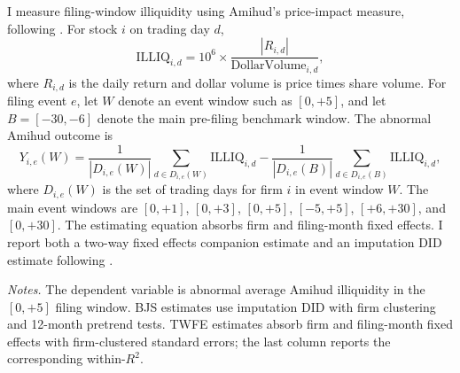 \documentclass[11pt]{article}
\newcommand{\TableNote}[1]{%
    \par\vspace{0.35em}
    \begin{minipage}{0.96\textwidth}
    \footnotesize\emph{Notes.} #1
    \end{minipage}
}
\begin{document}
I measure filing-window illiquidity using Amihud's price-impact measure,
following \citet{Amihud2002}.  For stock \(i\) on trading day \(d\),
\[
    \text{ILLIQ}_{i,d}
    =
    10^6 \times
    \frac{|R_{i,d}|}{\text{DollarVolume}_{i,d}},
\]
where \(R_{i,d}\) is the daily return and dollar volume is price times
share volume.  For filing event \(e\), let \(W\) denote an event window
such as \([0,+5]\), and let \(B=[-30,-6]\) denote the main pre-filing
benchmark window.  The abnormal Amihud outcome is
\[
    Y_{i,e}(W)
    =
    \frac{1}{|D_{i,e}(W)|}
    \sum_{d\in D_{i,e}(W)}
    \text{ILLIQ}_{i,d}
    -
    \frac{1}{|D_{i,e}(B)|}
    \sum_{d\in D_{i,e}(B)}
    \text{ILLIQ}_{i,d},
\]
where \(D_{i,e}(W)\) is the set of trading days for firm \(i\) in event
window \(W\).  The main event windows are \([0,+1]\), \([0,+3]\),
\([0,+5]\), \([-5,+5]\), \([+6,+30]\), and \([0,+30]\).  The estimating
equation absorbs firm and filing-month fixed effects.  I report both a
two-way fixed effects companion estimate and an imputation DID estimate
following \citet{BorusyakJaravelSpiess2024}.

\begin{table}[!htbp]
\centering
\caption{Filing-Window Amihud Illiquidity: Main \([0,+5]\) Window}
\label{tab:robots_amihud_main}
\begin{threeparttable}
\scriptsize
{}
\TableNote{The dependent variable is abnormal average Amihud illiquidity
in the \([0,+5]\) filing window. BJS estimates use imputation DID with
firm clustering and 12-month pretrend tests. TWFE estimates absorb firm
and filing-month fixed effects with firm-clustered standard errors; the
last column reports the corresponding within-\(R^2\).}
\end{threeparttable}
\end{table}
\end{document}
